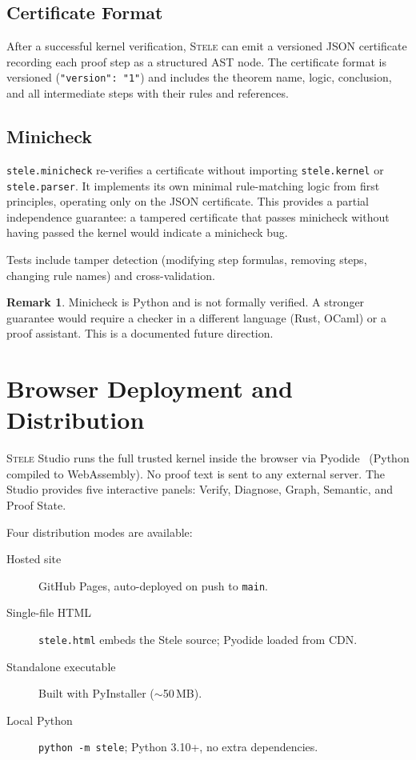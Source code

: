 \documentclass[11pt,a4paper]{article}
\theoremstyle{definition}
\newtheorem{remark}{Remark}
\theoremstyle{plain}
\newcommand{\stele}{\textsc{Stele}}
\begin{document}
\subsection{Certificate Format}

After a successful kernel verification, \stele{} can emit a
versioned JSON certificate recording each proof step as a
structured AST node.
The certificate format is versioned (\texttt{"version": "1"})
and includes the theorem name, logic, conclusion, and all
intermediate steps with their rules and references.

\subsection{Minicheck}

\texttt{stele.minicheck} re-verifies a certificate without
importing \texttt{stele.kernel} or \texttt{stele.parser}.
It implements its own minimal rule-matching logic from first
principles, operating only on the JSON certificate.
This provides a partial independence guarantee: a tampered
certificate that passes minicheck without having passed the
kernel would indicate a minicheck bug.

Tests include tamper detection (modifying step formulas,
removing steps, changing rule names) and cross-validation.

\begin{remark}
  Minicheck is Python and is not formally verified.
  A stronger guarantee would require a checker in a different
  language (Rust, OCaml) or a proof assistant.
  This is a documented future direction.
\end{remark}

\section{Browser Deployment and Distribution}
\label{sec:deployment}

\stele{} Studio runs the full trusted kernel inside the browser
via Pyodide~\cite{Pyodide} (Python compiled to WebAssembly).
No proof text is sent to any external server.
The Studio provides five interactive panels: Verify, Diagnose,
Graph, Semantic, and Proof State.

Four distribution modes are available:

\begin{description}
  \item[Hosted site] GitHub Pages, auto-deployed on push to \texttt{main}.
  \item[Single-file HTML] \texttt{stele.html} embeds the Stele
    source; Pyodide loaded from CDN.
  \item[Standalone executable] Built with PyInstaller (${\sim}$50\,MB).
  \item[Local Python] \texttt{python -m stele}; Python 3.10+,
    no extra dependencies.
\end{description}
\end{document}
